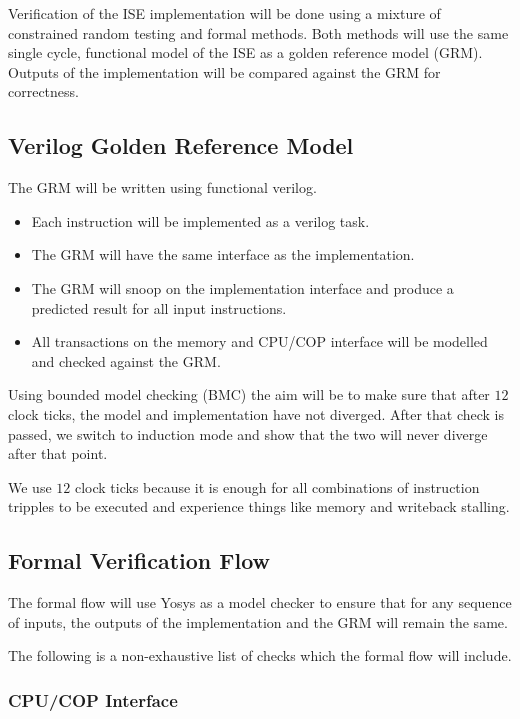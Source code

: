 
Verification of the ISE implementation will be done using a mixture of
constrained random testing and formal methods.
Both methods will use the same single cycle, functional model of the ISE as a
golden reference model (GRM).
Outputs of the implementation will be compared against the GRM for
correctness.

\subsection{Verilog Golden Reference Model}

The GRM will be written using functional verilog.

\begin{itemize}
\item Each instruction will be implemented as a verilog task.
\item The GRM will have the same interface as the implementation.
\item The GRM will snoop on the implementation interface and produce a
    predicted result for all input instructions.
\item All transactions on the memory and CPU/COP interface will be modelled
    and checked against the GRM.
\end{itemize}

Using bounded model checking (BMC) the aim will be to make sure that after
$12$ clock ticks, the model and implementation have not diverged.
After that check is passed, we switch to induction mode and show that the two
will never diverge after that point.

We use $12$ clock ticks because it is enough for all combinations of 
instruction tripples to be executed and experience things like memory
and writeback stalling.

\subsection{Formal Verification Flow}

The formal flow will use Yosys as a model checker to ensure that for any
sequence of inputs, the outputs of the implementation and the GRM will remain
the same.

The following is a non-exhaustive list of checks which the formal flow
will include.

\subsubsection{CPU/COP Interface}

